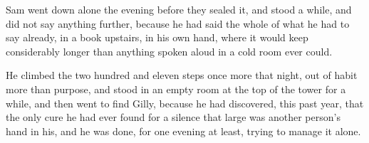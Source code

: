 Sam went down alone the evening before they sealed it, and stood a while, and did not say anything further, because he had said the whole of what he had to say already, in a book upstairs, in his own hand, where it would keep considerably longer than anything spoken aloud in a cold room ever could.

He climbed the two hundred and eleven steps once more that night, out of habit more than purpose, and stood in an empty room at the top of the tower for a while, and then went to find Gilly, because he had discovered, this past year, that the only cure he had ever found for a silence that large was another person’s hand in his, and he was done, for one evening at least, trying to manage it alone.